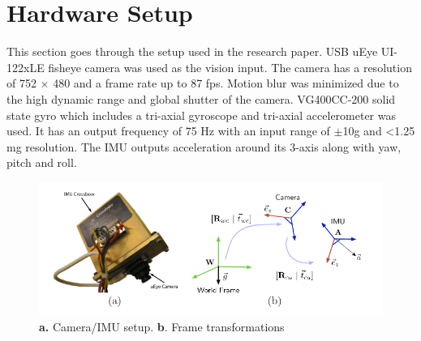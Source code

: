 \section{Hardware Setup}
\label{hardware_setup}

This section goes through the setup used in the research paper. USB uEye UI-122xLE fisheye camera was used as the vision input. The camera has a resolution of 752 × 480 and a frame rate up to 87 fps. Motion blur was minimized due to the high dynamic range and global shutter of the camera. VG400CC-200 solid state gyro which includes a tri-axial gyroscope and tri-axial accelerometer was used. It has an output frequency of 75 Hz with an input range of $\pm$10g and <1.25 mg resolution. The IMU outputs acceleration around its 3-axis along with yaw, pitch and roll.

\begin{figure}[!htb]
  \includegraphics[width=\textwidth]{./figures/imucam.png}
\caption{\textbf{a.} Camera/IMU setup. \textbf{b}. Frame transformations}
\label{fig:setup1}       %
\end{figure}